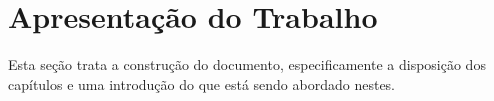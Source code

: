 

\section{Apresentação do Trabalho}
    \label{sec:apresentacao-trabalho}
    
    Esta seção trata a construção do documento, especificamente a disposição dos capítulos e uma introdução do que está sendo abordado nestes.